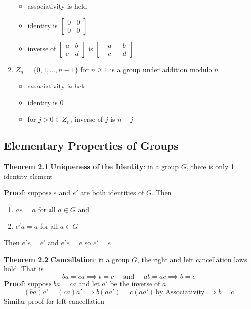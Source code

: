 \documentclass{article}
\begin{document}
\begin{enumerate}
\begin{itemize}
        \item associativity is held
        \item identity is $\begin{bmatrix} 0 & 0 \\ 0 & 0 \end{bmatrix}$
        \item inverse of $\begin{bmatrix} a & b \\ c & d \end{bmatrix}$ is $\begin{bmatrix} -a & -b \\ -c & -d \end{bmatrix}$
      \end{itemize}
    \item $Z_n = \{0, 1, \ldots, n - 1\}$ for $n \geq 1$ is a group under addition modulo $n$
      \begin{itemize}
        \item associativity is held
        \item identity is $0$
        \item for $j > 0 \in Z_n$, inverse of $j$ is $n - j$
      \end{itemize}
  \end{enumerate}
  \subsection{Elementary Properties of Groups}
  \textbf{Theorem 2.1 Uniqueness of the Identity}: in a group $G$, there is only 1 identity element
    
    \textbf{Proof}: suppose $e$ and $e'$ are both identities of $G$. Then
    \begin{enumerate}
      \item $ae = a$ for all $a \in G$ and
      \item $e'a = a$ for all $a \in G$
    \end{enumerate}

    Then $e'e = e'$ and $e'e = e$ so $e' = e$

    \bigskip

    \textbf{Theorem 2.2 Cancellation}: in a group $G$, the right and left cancellation laws hold. That is
      \[ba = ca \implies b =c \quad \text{ and } \quad ab = ac \implies b = c\]
      \textbf{Proof}: suppose $ba = ca$ and let $a'$ be the inverse of $a$
      \[(ba)a' = (ca)a' \implies b(aa') = c(aa') \, \text{by Associativity} \implies b = c\]
      Similar proof for left cancellation
      \newpage
\end{document}
